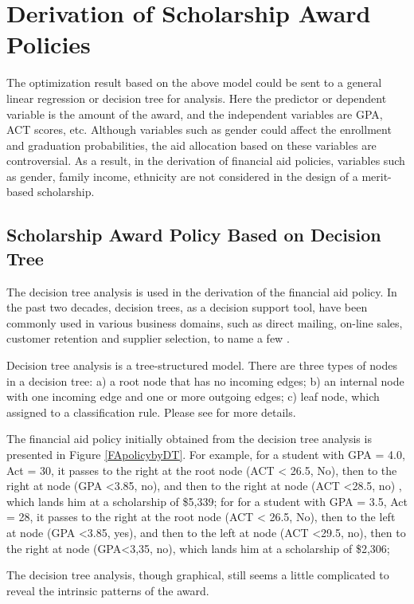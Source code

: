 \documentclass[12pt,english]{report}
\begin{document}
\section{Derivation of Scholarship Award Policies}
The optimization result based on the above model could be sent to a general linear regression or decision tree for analysis.  Here the predictor or dependent variable is the amount of the award, and the independent variables are GPA, ACT scores, etc.  Although variables such as gender could affect the enrollment and graduation probabilities, the aid allocation based on these variables are controversial. 
As a result, in the derivation of financial aid policies, variables such as gender, family income, ethnicity are not considered in the design of a merit-based scholarship.

\subsection{Scholarship Award Policy Based on Decision Tree }

The decision tree analysis is used in the derivation of the financial aid policy.  In the past two decades, decision trees, as a decision support tool, have been commonly used in various business domains, such as direct mailing, on-line sales, customer retention and supplier selection, to name a few \citep{Han2011}.

Decision tree analysis is a tree-structured model. There are three types of nodes in a decision tree: a) a root node that has no incoming edges; b) an internal node with one incoming edge and one or more outgoing edges; c) leaf node, which assigned to a classification rule. Please see \citep{Maimon2005} for more details.

The financial aid policy initially obtained from the decision tree analysis is presented in Figure \ref{FApolicybyDT}.  For example, for a student with GPA = 4.0, Act = 30, it passes to the right at the root node (ACT < 26.5, No), then to the right at node (GPA <3.85, no), and then to the right at node (ACT <28.5, no) , which lands him at a scholarship of \$5,339;   for  for a student with GPA = 3.5, Act = 28, it passes to the right at the root node (ACT < 26.5, No), then to the left at node (GPA <3.85, yes), and then to the left at node (ACT <29.5, no), then to the right at node (GPA<3,35, no), which lands him at a scholarship of \$2,306;   

The decision tree analysis, though graphical, still seems a little complicated to reveal the intrinsic patterns of the award. 
\end{document}
